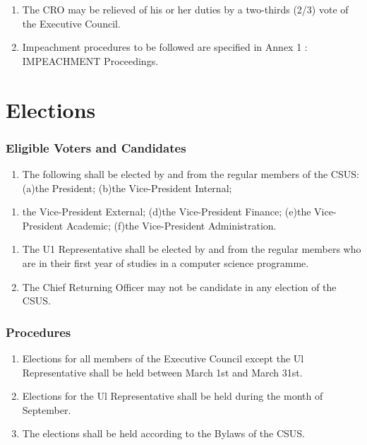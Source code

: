 \begin{enumerate}
\def\labelenumi{\arabic{enumi}.}
\setcounter{enumi}{1}
\item
  The CRO may be relieved of his or her duties by a two-thirds (2/3)
  vote of the Executive Council.
\item
  Impeachment procedures to be followed are specified in Annex 1 : IMPEACHMENT Proceedings.
\end{enumerate}

\part{Elections}\label{elections}

\section{Eligible Voters and
Candidates}\label{eligible-voters-and-candidates}

\begin{enumerate}
\def\labelenumi{\arabic{enumi}.}
\tightlist
\item
  The following shall be elected by and from the regular members of the
  CSUS: (a)the President; (b)the Vice-President Internal;
\end{enumerate}

\begin{enumerate}
\def\labelenumi{(\alph{enumi})}
\setcounter{enumi}{2}
\tightlist
\item
  the Vice-President External; (d)the Vice-President Finance; (e)the
  Vice-President Academic; (f)the Vice-President Administration.
\end{enumerate}

\begin{enumerate}
\def\labelenumi{\arabic{enumi}.}
\setcounter{enumi}{1}
\item
  The U1 Representative shall be elected by and from the regular members
  who are in their first year of studies in a computer science
  programme.
\item
  The Chief Returning Officer may not be candidate in any election of
  the CSUS.
\end{enumerate}

\section{Procedures}\label{procedures}

\begin{enumerate}
\def\labelenumi{\arabic{enumi}.}
\item
  Elections for all members of the Executive Council except the Ul
  Representative shall be held between March 1st and March 31st.
\item
  Elections for the Ul Representative shall be held during the month of
  September.
\item
  The elections shall be held according to the Bylaws of the CSUS.
\end{enumerate}

